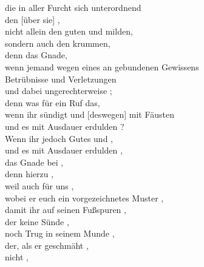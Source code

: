         die  in aller Furcht sich unterordnend \\
            den [über sie]  , \\
            nicht allein den guten und milden, \\
                sondern auch den krummen, \\
            denn das  Gnade, \\
            wenn jemand wegen eines an  gebundenen Gewissens \\
                Betrübnisse und Verletzungen  \\
                und dabei ungerechterweise ; \\
            denn was für ein Ruf  das, \\
                wenn ihr sündigt und [deswegen] mit Fäusten  \\
                und es mit Ausdauer erdulden ? \\
            Wenn ihr jedoch Gutes  und , \\
                und es mit Ausdauer erdulden , \\
                das  Gnade bei , \\
            denn hierzu , \\
                weil auch  für uns , \\
                    wobei er euch ein vorgezeichnetes Muster , \\
                damit ihr auf seinen Fußspuren , \\
                    der keine Sünde , \\
                    noch  Trug in seinem Munde , \\
                    der, als er geschmäht , \\
                    nicht , \\
